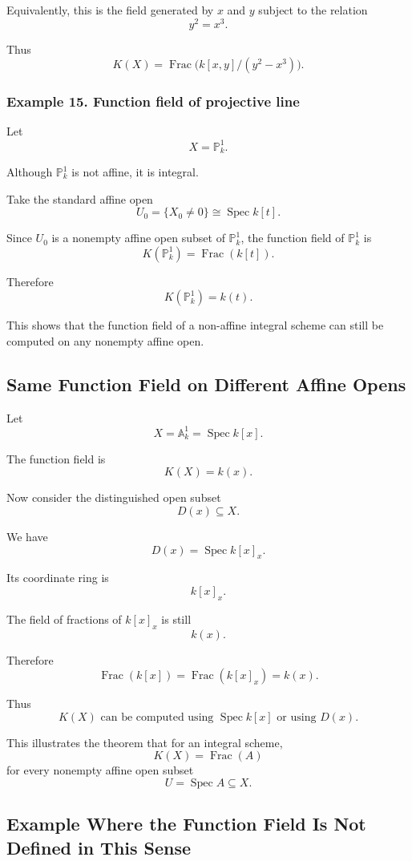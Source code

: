 \documentclass[12pt,a4paper]{article}
\theoremstyle{notespace}
\begin{document}
Equivalently, this is the field generated by \(x\) and \(y\) subject to the relation
\[
y^2=x^3.
\]

Thus
\[
\boxed{
	K(X)=\operatorname{Frac}\bigl(k[x,y]/(y^2-x^3)\bigr).
}
\]

\subsubsection*{Example 15. Function field of projective line}

Let
\[
X=\mathbb{P}^1_k.
\]

Although \(\mathbb{P}^1_k\) is not affine, it is integral.

Take the standard affine open
\[
U_0=\{X_0\neq 0\}\cong \operatorname{Spec}k[t].
\]

Since \(U_0\) is a nonempty affine open subset of \(\mathbb{P}^1_k\), the function field of \(\mathbb{P}^1_k\) is
\[
K(\mathbb{P}^1_k)=\operatorname{Frac}(k[t]).
\]

Therefore
\[
\boxed{
	K(\mathbb{P}^1_k)=k(t).
}
\]

This shows that the function field of a non-affine integral scheme can still be computed on any nonempty affine open.

\subsection{Same Function Field on Different Affine Opens}

Let
\[
X=\mathbb{A}^1_k=\operatorname{Spec}k[x].
\]

The function field is
\[
K(X)=k(x).
\]

Now consider the distinguished open subset
\[
D(x)\subseteq X.
\]

We have
\[
D(x)=\operatorname{Spec}k[x]_x.
\]

Its coordinate ring is
\[
k[x]_x.
\]

The field of fractions of \(k[x]_x\) is still
\[
k(x).
\]

Therefore
\[
\operatorname{Frac}(k[x])
=
\operatorname{Frac}(k[x]_x)
=
k(x).
\]

Thus
\[
\boxed{
	K(X)
	\text{ can be computed using } \operatorname{Spec}k[x]
	\text{ or using } D(x).
}
\]

This illustrates the theorem that for an integral scheme,
\[
K(X)=\operatorname{Frac}(A)
\]
for every nonempty affine open subset
\[
U=\operatorname{Spec}A\subseteq X.
\]

\subsection{Example Where the Function Field Is Not Defined in This Sense}
\end{document}
